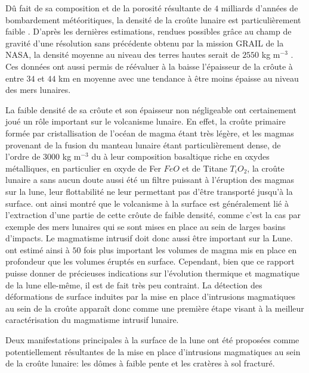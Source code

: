 Dû  fait  de sa  composition  et  de  la  porosité résultante  de  $4$
milliards  d'années de  bombardement météoritiques,  la densité  de la
croûte        lunaire        est        particulièrement        faible
\citep{Huang:2012gf,Han:2014ic}.   D'après les  dernières estimations,
rendues  possibles grâce  au champ  de gravité  d'une résolution  sans
précédente obtenu par la mission GRAIL  de la NASA, la densité moyenne
au   niveau  des   terres  hautes   serait  de   $2550$  kg   m$^{-3}$
\citep{Wieczorek:2013ipa}.  Ces données ont  aussi permis de réévaluer
à  la baisse  l'épaisseur de  la crôute  à entre  $34$ et  $44$ km  en
moyenne avec  une tendance  à être  moins épaisse  au niveau  des mers
lunaires.

La faible  densité de sa crôute  et son épaisseur non  négligeable ont
certainement joué  un rôle  important sur  le volcanisme  lunaire.  En
effet, la  croûte primaire  formée par  cristallisation de  l'océan de
magma  étant très  légère, et  les magmas  provenant de  la fusion  du
manteau lunaire étant particulièrement dense,  de l'ordre de $3000$ kg
m$^{-3}$ \citep{Kiefer:2012kp} du à  leur composition basaltique riche
en oxydes  métalliques, en  particulier en  oxyde de  Fer $FeO$  et de
Titane $T_iO_2$,  la croûte lunaire  a sans  aucun doute aussi  été un
filtre puissant à l'éruption des magmas sur la lune, leur flottabilité
ne    leur   permettant    pas    d'être    transporté   jusqu'à    la
surface. \citet{Wieczorek:2001jt} ont ainsi montré que le volcanisme à
la surface est  généralement lié à l'extraction d'une  partie de cette
crôute de  faible densité,  comme c'est  la cas  par exemple  des mers
lunaires  qui  se  sont  mises  en place  au  sein  de  larges  basins
d'impacts. Le magmatisme  intrusif doit donc aussi  être important sur
la  Lune.   \citet{Head:1992bk} ont  estimé  ainsi  à $50$  fois  plus
important les  volumes de  magma mis  en place  en profondeur  que les
volumes  éruptés en  surface. Cependant,  bien que  ce rapport  puisse
donner  de   précieuses  indications  sur  l'évolution   thermique  et
magmatique de  la lune elle-même, il  est de fait très  peu contraint.
La détection des déformations de surface induites par la mise en place
d'intrusions magmatiques au sein de  la croûte apparaît donc comme une
première  étape visant  à  la meilleur  caractérisation du  magmatisme
intrusif lunaire.

Deux  manifestations principales  à  la  surface de  la  lune ont  été
proposées  comme  potentiellement  résultantes  de la  mise  en  place
d'intrusions magmatiques  au sein  de la croûte  lunaire: les  dômes à
faible pente et les cratères à sol fracturé.

